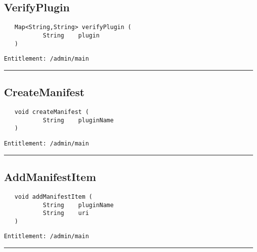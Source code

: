 \subsection{VerifyPlugin}
\label{Api:VerifyPlugin}
\begin{Verbatim}
   Map<String,String> verifyPlugin (
           String    plugin
   )
\end{Verbatim}
\begin{Verbatim}[formatcom=\color{Maroon}]
  Entitlement: /admin/main
\end{Verbatim}



\rule{12cm}{2pt}
\subsection{CreateManifest}
\label{Api:CreateManifest}
\begin{Verbatim}
   void createManifest (
           String    pluginName
   )
\end{Verbatim}
\begin{Verbatim}[formatcom=\color{Maroon}]
  Entitlement: /admin/main
\end{Verbatim}



\rule{12cm}{2pt}
\subsection{AddManifestItem}
\label{Api:AddManifestItem}
\begin{Verbatim}
   void addManifestItem (
           String    pluginName
           String    uri
   )
\end{Verbatim}
\begin{Verbatim}[formatcom=\color{Maroon}]
  Entitlement: /admin/main
\end{Verbatim}



\rule{12cm}{2pt}
